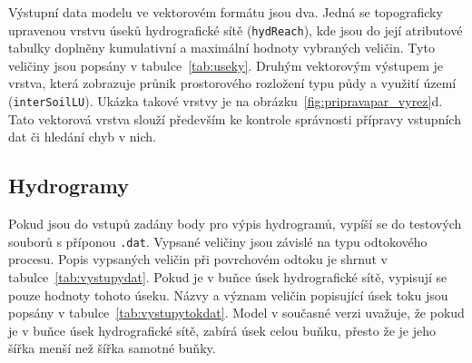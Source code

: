 Výstupní data modelu ve vektorovém formátu jsou dva. Jedná se topograficky upravenou vrstvu  úseků hydrografické sítě ({\tt hydReach}), kde jsou do její atributové tabulky doplněny kumulativní a maximální hodnoty vybraných veličin. Tyto veličiny jsou popsány v tabulce~\ref{tab:useky}. Druhým vektorovým výstupem je vrstva, která zobrazuje průnik prostorového rozložení typu půdy a využití území ({\tt interSoilLU}). Ukázka takové vrstvy je na obrázku~\ref{fig:pripravapar_vyrez}d. Tato vektorová vrstva slouží především ke kontrole správnosti přípravy vstupních dat či hledání chyb v nich. 













\subsection{Hydrogramy}\label{sec:hydrogramy}

Pokud jsou do vstupů zadány body pro výpis hydrogramů, vypíší se do testových souborů s příponou {\tt.dat}. Vypsané veličiny jsou závislé na typu odtokového procesu. Popis vypsaných veličin při povrchovém odtoku je shrnut v tabulce~\ref{tab:vystupydat}. Pokud je v buňce úsek hydrografické sítě, vypisují se pouze hodnoty tohoto úseku. Názvy a význam veličin popisující úsek toku jsou popsány v tabulce~\ref{tab:vystupytokdat}. Model v současné verzi uvažuje, že pokud je v buňce úsek hydrografické sítě, zabírá úsek celou buňku, přesto že je jeho šířka menší než šířka samotné buňky.  






% 


% 












